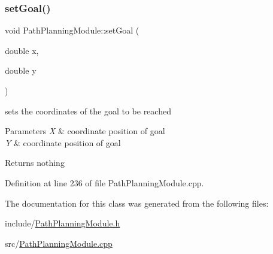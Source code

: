 \subsubsection{\texorpdfstring{set\+Goal()}{setGoal()}}
{\footnotesize\ttfamily void Path\+Planning\+Module\+::set\+Goal (\begin{DoxyParamCaption}\item[{double}]{x,  }\item[{double}]{y }\end{DoxyParamCaption})}



sets the coordinates of the goal to be reached 


\begin{DoxyParams}{Parameters}
{\em X} & coordinate position of goal\\
\hline
{\em Y} & coordinate position of goal\\
\hline
\end{DoxyParams}
\begin{DoxyReturn}{Returns}
nothing 
\end{DoxyReturn}


Definition at line 236 of file Path\+Planning\+Module.\+cpp.



The documentation for this class was generated from the following files\+:\begin{DoxyCompactItemize}
\item 
include/\mbox{\hyperlink{_path_planning_module_8h}{Path\+Planning\+Module.\+h}}\item 
src/\mbox{\hyperlink{_path_planning_module_8cpp}{Path\+Planning\+Module.\+cpp}}\end{DoxyCompactItemize}
